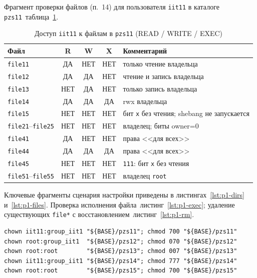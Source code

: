 Фрагмент проверки файлов (п.~14) для пользователя \texttt{iit11} в каталоге \texttt{pzs11}~\mdash  таблица~\ref{tab:p1-files-iit11}.

\begin{table}[ht]
	\begin{tabularx}{\textwidth}{|l|c|c|c|X|}
		\hline
		\textbf{Файл} & R & W & X & \textbf{Комментарий} \\
		\hline
		\texttt{file11} & ДА & НЕТ & НЕТ & только чтение владельца \\
		\hline
		\texttt{file12} & ДА & ДА & НЕТ & чтение и запись владельца \\
		\hline
		\texttt{file13} & НЕТ & ДА & НЕТ & только запись владельца \\
		\hline
		\texttt{file14} & ДА & ДА & ДА & rwx владельца \\
		\hline
		\texttt{file15} & НЕТ & НЕТ & НЕТ & бит \texttt{x} без чтения; shebang не запускается \\
		\hline
		\texttt{file21}--\texttt{file25} & НЕТ & НЕТ & НЕТ & владелец; биты owner=0 \\
		\hline
		\texttt{file41} & ДА & НЕТ & НЕТ & права <<для всех>> \\
		\hline
		\texttt{file44} & ДА & ДА & ДА & права <<для всех>> \\
		\hline
		\texttt{file45} & НЕТ & НЕТ & НЕТ & \texttt{111}: бит \texttt{x} без чтения \\
		\hline
		\texttt{file51}--\texttt{file55} & НЕТ & НЕТ & НЕТ & владелец \texttt{root} \\
		\hline
	\end{tabularx}
	\caption{Доступ \texttt{iit11} к файлам в \texttt{pzs11} (READ / WRITE / EXEC)}
	\label{tab:p1-files-iit11}
\end{table}

Ключевые фрагменты сценария настройки приведены в листингах~\ref{lst:p1-dirs} и~\ref{lst:p1-files}. Проверка исполнения файла~\mdash  листинг~\ref{lst:p1-exec}; удаление существующих \texttt{file*} с восстановлением~\mdash  листинг~\ref{lst:p1-rm}.

\begin{lstlisting}[caption={Владельцы и режимы каталогов},label={lst:p1-dirs}]
chown iit11:group_iit1 "${BASE}/pzs11"; chmod 700 "${BASE}/pzs11"
chown root:group_iit1  "${BASE}/pzs12"; chmod 070 "${BASE}/pzs12"
chown root:root        "${BASE}/pzs13"; chmod 007 "${BASE}/pzs13"
chown iit11:group_iit1 "${BASE}/pzs14"; chmod 777 "${BASE}/pzs14"
chown root:root        "${BASE}/pzs15"; chmod 700 "${BASE}/pzs15"
\end{lstlisting}

